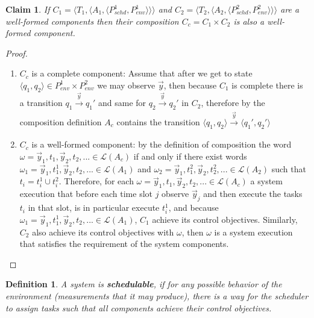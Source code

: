 \documentclass[ twoside, 12pt ]{article}
\newtheorem{dfn}{Definition} %
\newtheorem{claim}[thm]{Claim}
\begin{document}
\begin{claim}
    \label{thm:valid_composition}
    If $C_1=\langle T_1, \langle A_1, \langle P_{schd}^1, P_{env}^1\rangle\rangle\rangle$ and $C_2=\langle T_2, \langle A_2, \langle P_{schd}^2, P_{env}^2\rangle\rangle\rangle$ are a well-formed components then their composition $C_c=C_1 \times C_2$ is also a well-formed component.
\end{claim}
\begin{proof}
    \begin{enumerate}
        
        \item $C_c$ is a complete component: Assume that after we get to state $\langle q_1 , q_2 \rangle \in P_{env}^1 \times P_{env}^2$ we may observe $\vec{y}$, then because $C_1$ is complete there is a transition $q_1 \xrightarrow[]{\vec{y}} q_1'$ and same for $q_2 \xrightarrow[]{\vec{y}} q_2'$ in $C_2$, therefore by the composition definition $A_c$ contains the transition $\langle q_1 , q_2 \rangle \xrightarrow[]{\vec{y}} \langle q_1' , q_2' \rangle$
        
        \item $C_c$ is a well-formed component: by the definition of composition the word $\omega= \vec{y}_1 , t_1 , \vec{y}_2 , t_2, ... \in \mathcal{L}(A_c)$ if and only if there exist words $\omega_1= \vec{y}_1 , t_1^1 , \vec{y}_2, t_2, ... \in \mathcal{L}(A_1)$ and $\omega_2= \vec{y}_1 , t_1^2 , \vec{y}_2 , t_2^2, ... \in \mathcal{L}(A_2)$ such that $t_i = t_i^1 \cup t_i^2$. 
        Therefore, for each $\omega = \vec{y}_1 , t_1 , \vec{y}_2 , t_2, ... \in \mathcal{L}(A_c)$ a system execution that before each time slot $j$ observe $\vec{y}_j$ and then execute the tasks $t_i$ in that slot, is in particular execute $t_i^1$, and because $\omega_1= \vec{y}_1 , t_1^1 , \vec{y}_2 , t_2, ... \in \mathcal{L}(A_1)$, $C_1$ achieve its control objectives. Similarly, $C_2$ also achieve its control objectives with $\omega$, then $\omega$ is a system execution that satisfies the requirement of the system components.
        
    \end{enumerate}
\end{proof}

\begin{dfn}
	A system is \textbf{schedulable}, if for any possible behavior of the environment (measurements that it may produce), there is a way for the scheduler to assign tasks such that all components achieve their control objectives.
\end{dfn}
\end{document}
